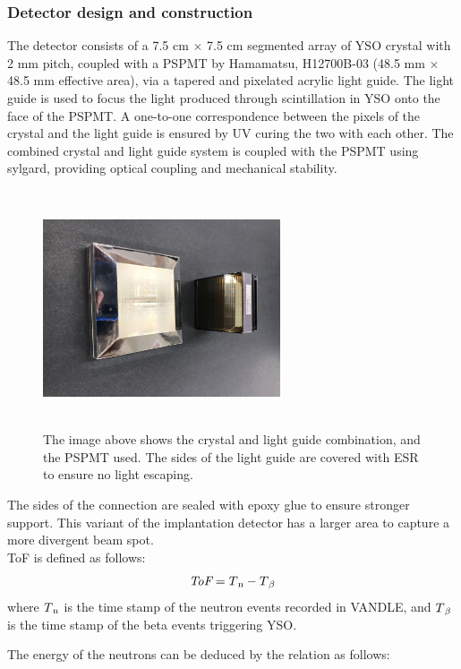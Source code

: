 \subsubsection{Detector design and construction}
The detector consists of a 7.5 cm $\times$ 7.5 cm segmented array of YSO crystal with 2 mm pitch, coupled with a PSPMT by Hamamatsu, H12700B-03 (48.5 mm $\times$ 48.5 mm effective area), via a tapered and pixelated acrylic light guide. The light guide is used to focus the light produced through scintillation in YSO onto the face of the PSPMT. A one-to-one correspondence between the pixels of the crystal and the light guide is ensured by UV curing the two with each other. The combined crystal and light guide system is coupled with the PSPMT using sylgard, providing optical coupling and mechanical stability. 
\begin{figure}[h!]
	\centering
	\includegraphics[width=7cm,height=7cm]{figures/new_yso_tapered_light_guide.jpg}
	\caption[The image above shows the crystal and light guide]{The image above shows the crystal and light guide combination, and the PSPMT used. The sides of the light guide are covered with ESR to ensure no light escaping.}
	\label{fig:yso_light_guidel}
\end{figure}
The sides of the connection are sealed with epoxy glue to ensure stronger support. This variant of the implantation detector has a larger area to capture a more divergent beam spot. \\
ToF is defined as follows:
\begin{equation}
\textit{ToF}=T\textsubscript{n}-T\textsubscript{$\beta$}
\end{equation}
where $T\textsubscript{n}$ is the time stamp of the neutron events recorded in VANDLE, and $T\textsubscript{$\beta$}$ is the time stamp of the beta events triggering YSO.

The energy of the neutrons can be deduced by the relation as follows:

